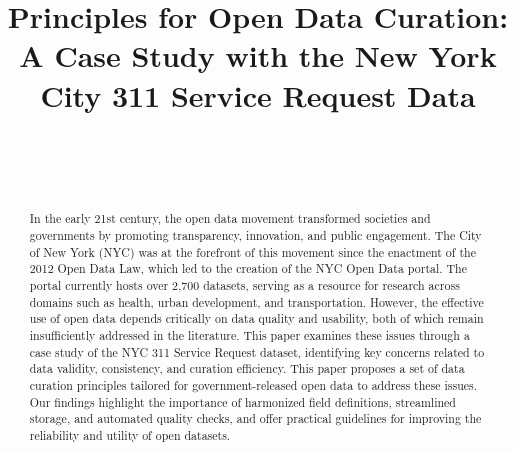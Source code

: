 \documentclass[linenumber]{jdsart}
\begin{document}


\begin{frontmatter}

\title{Principles for Open Data Curation: A Case Study with the New
York City 311 Service Request Data}

\author[1]{~}
\author[2]{~}
\address[1]{, }
\address[2]{Department of Statistics,
, }


\begin{abstract}
In the early 21st century, the open data movement transformed 
societies and governments by promoting transparency,
innovation, and public engagement. The City of New York (NYC) was at
the forefront of this movement since the enactment of the 2012 Open 
Data Law, which led to the creation of the NYC Open Data
portal. The portal currently hosts over 2,700 datasets,
serving as a resource for research across domains such as 
health, urban development, and transportation. However, the effective 
use of open data depends critically on data quality and usability, 
both of which remain insufficiently addressed in the literature. 
This paper examines these issues through a case study of the NYC 311
Service Request dataset, identifying key concerns related to data
validity, consistency, and curation efficiency.
This paper proposes a set of data curation principles tailored for 
government-released open data to address these issues. Our findings highlight 
the importance of harmonized field definitions,
streamlined storage, and automated quality checks, and offer practical
guidelines for improving the reliability and utility of open datasets.

\end{abstract}

\begin{keyword} %
\end{keyword}

\end{frontmatter}

\end{document}
